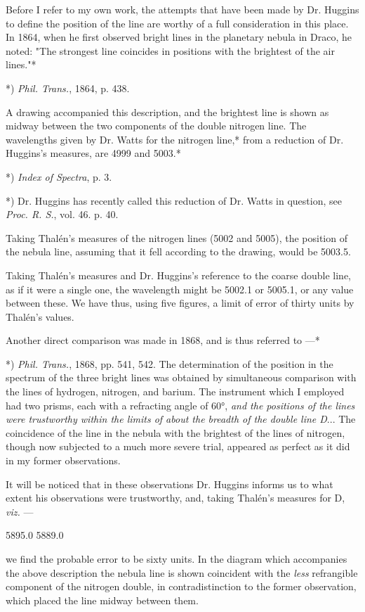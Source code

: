 \documentclass[a4paper, 12pt, oneside, polutonikogreek, english]{article}
\begin{document}
Before I refer to my own work, the attempts that have been made by Dr. Huggins to define the position of the line are worthy of a full consideration in this place. In 1864, when he first observed bright lines in the planetary nebula in Draco, he noted: "The strongest line coincides in positions with the brightest of the air lines."*

*) \emph{Phil. Trans.}, 1864, p. 438.

A drawing accompanied this description, and the brightest line is shown as midway between the two components of the double nitrogen line. The wavelengths given by Dr. Watts for the nitrogen line,* from a reduction of Dr. Huggins's measures, are 4999 and 5003.*

*) \emph{Index of Spectra}, p. 3.

*) Dr. Huggins has recently called this reduction of Dr. Watts in question, see \emph{Proc. R. S.}, vol. 46. p. 40.

Taking Thalén's measures of the nitrogen lines (5002 and 5005), the position of the nebula line, assuming that it fell according to the drawing, would be 5003.5.

Taking Thalén's measures and Dr. Huggins's reference to the coarse double line, as if it were a single one, the wavelength might be 5002.1 or 5005.1, or any value between these. We have thus, using five figures, a limit of error of thirty units by Thalén's values.

Another direct comparison was made in 1868, and is thus referred to ---*

*) \emph{Phil. Trans.}, 1868, pp. 541, 542.
 The determination of the position in the spectrum of the three bright lines was obtained by simultaneous comparison with the lines of hydrogen, nitrogen, and barium. The instrument which I employed had two prisms, each with a refracting angle of 60°, \emph{and the positions of the lines were trustworthy within the limits of about the breadth of the double line D}... The coincidence of the line in the nebula with the brightest of the lines of nitrogen, though now subjected to a much more severe trial, appeared as perfect as it did in my former observations.

It will be noticed that in these observations Dr. Huggins informs us to what extent his observations were trustworthy, and, taking Thalén's measures for D, \emph{viz.} ---

5895.0 
5889.0

we find the probable error to be sixty units. In the diagram which accompanies the above description the nebula line is shown coincident with the \emph{less} refrangible component of the nitrogen double, in contradistinction to the former observation, which placed the line midway between them.
\end{document}
